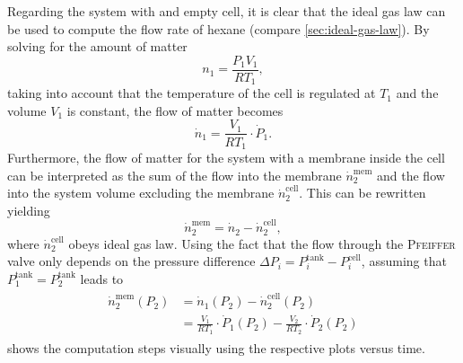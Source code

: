 \documentclass[../thesis.tex]{subfiles}
\begin{document}
        Regarding the system with and empty cell, it is clear that the ideal gas law can be used to compute the flow rate of hexane (compare \cref{sec:ideal-gas-law}). By solving for the amount of matter
        \begin{equation*}
            n_1 = \frac{P_1V_1}{RT_1},
        \end{equation*}
        taking into account that the temperature of the cell is regulated at $T_1$ and the volume $V_1$ is constant, the flow of matter becomes
        \begin{equation*}
            \dot{n}_1 = \frac{V_1}{RT_1}\cdot \dot{P}_1.
            \label{eq:n1}
        \end{equation*}
        Furthermore, the flow of matter for the system with a membrane inside the cell can be interpreted as the sum of the flow into the membrane $\dot{n}_2^\mathrm{mem}$ and the flow into the system volume excluding the membrane $\dot{n}_2^\mathrm{cell}$. This can be rewritten yielding
        \begin{equation*}
            \dot{n}_2^\mathrm{mem} = \dot{n}_2 - \dot{n}_2^\mathrm{cell},
        \end{equation*}
        where $\dot{n}^\mathrm{cell}_2$ obeys ideal gas law. Using the fact that the flow through the \textsc{Pfeiffer} valve only depends on the pressure difference $\Delta P_i = P_i^\mathrm{tank} - P_i^\mathrm{cell}$, assuming that $P_1^\mathrm{tank} = P_2^\mathrm{tank}$ leads to
        \begin{align}
            \begin{split}
                \dot{n}_2^\mathrm{mem}(P_2) &= \dot{n}_1(P_2) - \dot{n}_2^\mathrm{cell}(P_2)\\
                &=\frac{V_1}{RT_1}\cdot \dot{P}_1(P_2) - \frac{V_2}{RT_2}\cdot \dot{P}_2(P_2)
            \end{split}
            \label{eq:ndot-membrane}
        \end{align}
         shows the computation steps visually using the respective plots versus time.
\end{document}
